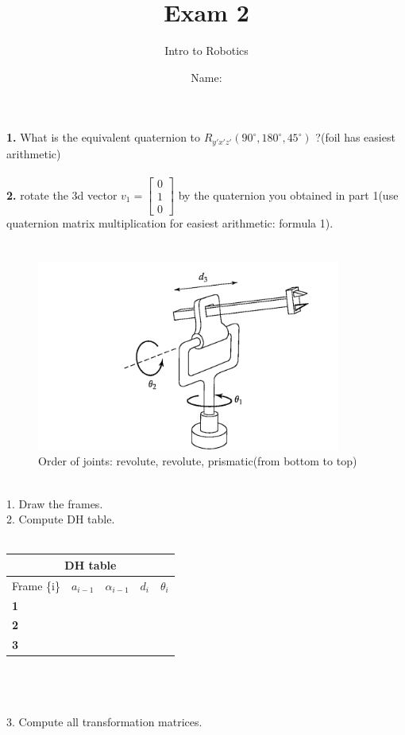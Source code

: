 \documentclass{article}
\title{Exam 2}
\author{Intro to Robotics}
\date{Name: }
\begin{document}
\maketitle
\section{}
\textbf{1.} What is the equivalent quaternion to $R_{y'x'z'}(90^\circ, 180^\circ, 45^\circ)$ ?(foil has easiest arithmetic) \\\\
\textbf{2. }rotate the 3d vector $v_{1}=\begin{bmatrix}
0  \\
1 \\
0
\end{bmatrix}$ by the quaternion you obtained in part 1(use quaternion matrix multiplication for easiest arithmetic: formula 1). \newpage

\section{}
\begin{figure}[htp]
    \centering
    \includegraphics[width=10cm]{kinematics.png}
    \caption{Order of joints: revolute, revolute, prismatic(from bottom to top)}
    \label{fig:Arm}
\end{figure}\\
1. Draw the frames.\\
2. Compute DH table.\\\\
\begin{tabular}{ |p{3cm}|p{3cm}|p{3cm}| p{3cm} | p{3cm} |}
\hline
\multicolumn{5}{|c|}{DH table} \\
\hline
Frame \{i\} & \textbf{$a_{i-1}$} & \textbf{$\alpha_{i-1}$} & \textbf{$d_i$} & \textbf{$\theta_i$} \\
\hline
\textbf{1} &  &  &  &\\
\hline
\textbf{2} &  &  &  & \\
\hline
\textbf{3} &  &  &  & \\
\hline
\end{tabular}\\\\\\
3. Compute all transformation matrices.\\
\end{document}
